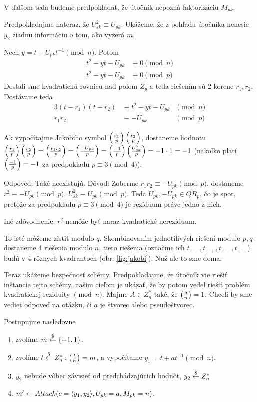 V ďalšom teda budeme predpokladať, že útočník nepozná faktorizáciu $M_{pk}$.

Predpokladajme nateraz, že $U_{sk}^2 \equiv U_{pk}$.
Ukážeme, že z pohľadu útočníka nenesie $y_2$ žiadnu informáciu o tom, ako
vyzerá $m$.

Nech $y = t - U_{pk} t^{-1} \pmod{n}$.
Potom
\begin{align*}
    t^2 - y t - U_{pk} &\equiv 0 \pmod{n} \\
    t^2 - y t - U_{pk} &\equiv 0 \pmod{p}
\end{align*}
Dostali sme kvadratickú rovnicu nad poľom $Z_p$ a teda riešením sú 2 korene
$r_1,r_2$.
Dostávame teda
\begin{alignat*}{3}
    (t-r_1)(t-r_2) &\equiv t^2 - y t - U_{pk} &\pmod{n}\\
    r_1 r_2 &\equiv -U_{pk} &\pmod{p}
\end{alignat*}

Ak vypočítajme Jakobiho symbol $\left( \frac{r_1}{p} \right) \left( \frac{r_2}{p} \right)$,
dostaneme hodnotu $\left( \frac{r_1}{p} \right)\left( \frac{r_2}{p} \right) = \left( \frac{r_1 r_2}{p} \right) =
\left( \frac{-U_{pk}}{p} \right) = \left( \frac{-1}{p} \right) \left( \frac{U_{sk}^2}{p} \right)=-1\cdot 1=-1$
(nakoľko platí $\left( \frac{-1}{p} \right)=-1$ za predpokladu $p \equiv 3 \pmod{4}$).

\begin{poznamka}
    Odpoveď: Také neexistujú. Dôvod:
    Zoberme $r_1 r_2 \equiv -U_{pk} \pmod{p}$, dostaneme $r^2 \equiv
    -U_{pk} \pmod{p}$, $U_{sk}^2 \equiv U_{pk} \pmod{p}$. Teda
    $U_{pk}, -U_{pk} \in QR_p$, čo je spor, pretože za predpokladu 
    $p\equiv 3 \pmod{4}$ je rezíduum práve jedno z nich.

    Iné zdôvodnenie: $r^2$ nemôže byť naraz kvadratické nerezíduum.
\end{poznamka}

To isté môžeme zistiť modulo $q$.
Skombinovaním jednotilivých riešení modulo $p,q$ dostaneme 4 riešenia
modulo $n$, tieto riešenia (označme ich $t_{--}, t_{-+}, t_{+-},
t_{++}$) budú v 4 rôznych kvadrantoch 
(obr. \ref{fig:jakobi}). Nuž ale to sme doma.

Teraz ukážeme bezpečnosť schémy. Predpokladajme, že útočník vie riešiť
inštancie tejto schémy, našim cieľom je ukázať, že by potom vedel
riešiť problém kvadratickej reziduity $\pmod{n}$.
Majme $A \in Z_n^*$ také, že $\left( \frac{a}{n} \right)=1$. Chceli by sme vedieť
odpoveď na otázku, či $a$ je štvorec alebo pseudoštvorec.

Postupujme nasledovne
\begin{enumerate}
    \item zvolíme $m \overset{\$}{\leftarrow} \{-1,1\}$.
    \item zvolíme $t \overset{\$}{\leftarrow} Z_n^*: \left( \frac{t}{n} \right)=m$, a vypočítame
        $y_1 = t + a t^{-1} \pmod{n}$.
    \item $y_2$ nebude vôbec závisieť od predchádzajúcich hodnôt,
            $y_2 \overset{\$}{\leftarrow} Z_n^*$
    \item $m' \leftarrow Attack(c=\langle y_1, y_2 \rangle, U_{pk}=a,M_{pk}=n)
            $.
\end{enumerate}
